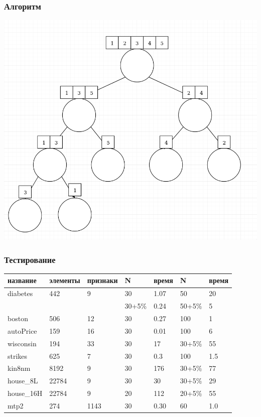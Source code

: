 \documentclass{beamer}
\begin{document}
\begin{frame}
\frametitle{Алгоритм}
    \begin{center}
    \includegraphics[height=0.8\textheight]{merge.png}
    \end{center}
\end{frame}

\begin{frame}
\frametitle{Тестирование}

\hspace*{-0.8cm}
    \begin{tabular}{l l l l l l l}

        название        & элементы  & признаки & N & время & N & время \\

        \toprule

        diabetes        & 442    & 9     & 30 & 1.07  & 50       & 20\\
                        &        &       & 30+5\% & 0.24  & 50+5\%      & 5\\
        boston          & 506    & 12    & 30 & 0.27  & 100      & 1\\
        autoPrice       & 159    & 16    & 30 & 0.01  & 100      & 6\\
        wisconsin       & 194    & 33    & 30 & 17    & 30+5\%   & 55\\
        strikes         & 625    & 7     & 30 & 0.3   & 100      & 1.5\\
        kin8nm          & 8192   & 9     & 30 & 176   & 30+5\%   & 77\\
        house\_8L       & 22784  & 9     & 30 & 30    & 30+5\%   & 29\\
        house\_16H      & 22784  & 9     & 20 & 112   & 20+5\%   & 55\\
        mtp2            & 274    & 1143  & 30 & 0.30  & 60       & 1.0\\

    \end{tabular}
\hspace*{-0.8cm}


\end{frame}
\end{document}
